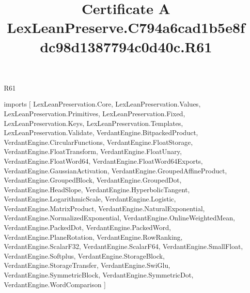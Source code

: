 \begin{lexlean}{R61}
\title{Certificate A LexLeanPreserve.C794a6cad1b5e8fdc98d1387794c0d40c.R61}
\begin{coremodule}
imports [
  LexLeanPreservation.Core,
  LexLeanPreservation.Values,
  LexLeanPreservation.Primitives,
  LexLeanPreservation.Fixed,
  LexLeanPreservation.Keys,
  LexLeanPreservation.Templates,
  LexLeanPreservation.Validate,
  VerdantEngine.BitpackedProduct,
  VerdantEngine.CircularFunctions,
  VerdantEngine.FloatStorage,
  VerdantEngine.FloatTransform,
  VerdantEngine.FloatUnary,
  VerdantEngine.FloatWord64,
  VerdantEngine.FloatWord64Exports,
  VerdantEngine.GaussianActivation,
  VerdantEngine.GroupedAffineProduct,
  VerdantEngine.GroupedBlock,
  VerdantEngine.GroupedDot,
  VerdantEngine.HeadSlope,
  VerdantEngine.HyperbolicTangent,
  VerdantEngine.LogarithmicScale,
  VerdantEngine.Logistic,
  VerdantEngine.MatrixProduct,
  VerdantEngine.NaturalExponential,
  VerdantEngine.NormalizedExponential,
  VerdantEngine.OnlineWeightedMean,
  VerdantEngine.PackedDot,
  VerdantEngine.PackedWord,
  VerdantEngine.PlaneRotation,
  VerdantEngine.RowRanking,
  VerdantEngine.ScalarF32,
  VerdantEngine.ScalarF64,
  VerdantEngine.SmallFloat,
  VerdantEngine.Softplus,
  VerdantEngine.StorageBlock,
  VerdantEngine.StorageTransfer,
  VerdantEngine.SwiGlu,
  VerdantEngine.SymmetricBlock,
  VerdantEngine.SymmetricDot,
  VerdantEngine.WordComparison
]


\end{coremodule}
\end{lexlean}
